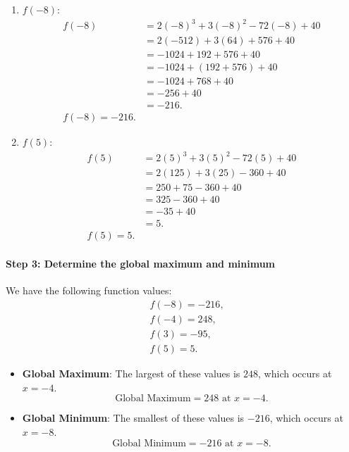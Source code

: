 \documentclass[12pt]{article}
\begin{document}
\begin{enumerate}
    \item \(f(-8)\):
    \[
    \begin{aligned}
    f(-8) &= 2(-8)^3 + 3(-8)^2 - 72(-8) + 40 \\[4pt]
          &= 2(-512) + 3(64) + 576 + 40 \\[4pt]
          &= -1024 + 192 + 576 + 40 \\[4pt]
          &= -1024 + (192 + 576) + 40 \\[4pt]
          &= -1024 + 768 + 40 \\[4pt]
          &= -256 + 40 \\[4pt]
          &= -216.\\[4pt]
    \boxed{f(-8) = -216.}
    \end{aligned}
    \]
    
    \item \(f(5)\):
    \[
    \begin{aligned}
    f(5) &= 2(5)^3 + 3(5)^2 - 72(5) + 40 \\[4pt]
         &= 2(125) + 3(25) - 360 + 40 \\[4pt]
         &= 250 + 75 - 360 + 40 \\[4pt]
         &= 325 - 360 + 40 \\[4pt]
         &= -35 + 40 \\[4pt]
         &= 5.\\[4pt]
    \boxed{f(5) = 5.}
    \end{aligned}
    \]
\end{enumerate}

\paragraph{Step 3: Determine the global maximum and minimum}

We have the following function values:
\[
\begin{aligned}
& f(-8) = -216,\\
& f(-4) = 248,\\
& f(3)  = -95,\\
& f(5)  = 5.
\end{aligned}
\]

\begin{itemize}
    \item \textbf{Global Maximum}: The largest of these values is \(248\), which occurs at \(x = -4\).
    \[
    \boxed{\text{Global Maximum} = 248 \text{ at } x = -4.}
    \]
    
    \item \textbf{Global Minimum}: The smallest of these values is \(-216\), which occurs at \(x = -8\).
    \[
    \boxed{\text{Global Minimum} = -216 \text{ at } x = -8.}
    \]
\end{itemize}
\newpage
\end{document}
